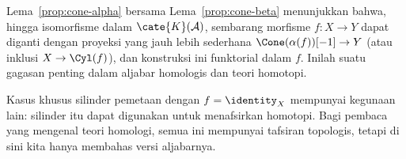 Lema~\ref{prop:cone-alpha} bersama Lema~\ref{prop:cone-beta} menunjukkan
bahwa, hingga isomorfisme dalam $\cate{K}(\mathcal{A})$, sembarang morfisme
$f:X\to Y$ dapat diganti dengan proyeksi yang jauh lebih sederhana
$\Cone(\alpha(f))[-1]\to Y$ (atau inklusi $X\to\Cyl(f)$), dan konstruksi ini
funktorial dalam $f$. Inilah suatu gagasan penting dalam aljabar homologis
dan teori homotopi.

Kasus khusus silinder pemetaan dengan $f=\identity_X$ mempunyai kegunaan lain:
silinder itu dapat digunakan untuk menafsirkan homotopi. Bagi pembaca yang
mengenal teori homologi, semua ini mempunyai tafsiran topologis, tetapi di
sini kita hanya membahas versi aljabarnya.

